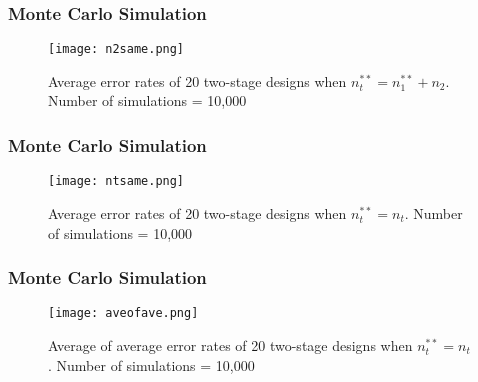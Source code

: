 \documentclass{beamer}\usepackage[]{graphicx}\usepackage[]{color}
\begin{document}
\begin{frame}
\frametitle{Monte Carlo Simulation}
\tiny
\begin{figure}
\caption{Average error rates of 20 two-stage designs when $n_t^{\ast\ast} = n_1^{\ast\ast} + n_2$. Number of simulations = 10,000}
\texttt{[image: n2same.png]}
\end{figure}
\end{frame}

\begin{frame}
\frametitle{Monte Carlo Simulation}
\tiny
\begin{figure}
\caption{Average error rates of 20 two-stage designs when $n_t^{\ast\ast} = n_t$. Number of simulations = 10,000}
\texttt{[image: ntsame.png]}
\end{figure}
\end{frame}

\begin{frame}
\frametitle{Monte Carlo Simulation}
\begin{figure}
\caption{Average of average error rates of 20 two-stage designs when $n_t^{\ast\ast} = n_t$. Number of simulations = 10,000}
\texttt{[image: aveofave.png]}
\end{figure}
\end{frame}

\end{document}
